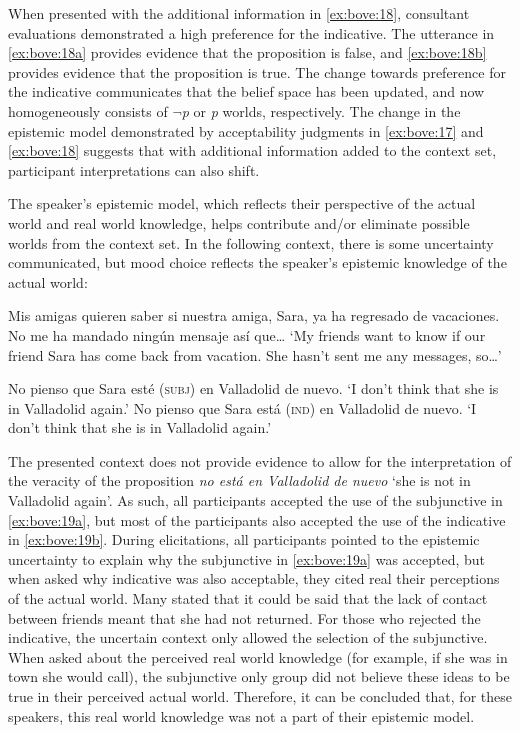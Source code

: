 \documentclass[output=paper,colorlinks,citecolor=brown,
]{langscibook}
\begin{document}
When presented with the additional information in \ref{ex:bove:18}, consultant evaluations demonstrated a high preference for the indicative. The utterance in \ref{ex:bove:18a} provides evidence that the proposition is false, and \ref{ex:bove:18b} provides evidence that the proposition is true. The change towards preference for the indicative communicates that the belief space has been updated, and now homogeneously consists of $\neg$\textit{p} or \textit{p }worlds, respectively. The change in the epistemic model demonstrated by acceptability judgments in \ref{ex:bove:17} and \ref{ex:bove:18} suggests that with additional information added to the context set, participant interpretations can also shift. 



The speaker's epistemic model, which reflects their perspective of the actual world and real world knowledge, helps contribute and/or eliminate possible worlds from the context set. In the following context, there is some uncertainty communicated, but mood choice reflects the speaker's epistemic knowledge of the actual world:


\begin{exe} %
    \ex\label{ex:bove:19} 
   Mis amigas quieren saber si nuestra amiga, Sara, ya ha regresado de vacaciones. No me ha mandado ningún mensaje así que\dots
    \glt `My friends want to know if our friend Sara has come back from vacation. She hasn’t sent me any messages, so\dots'
    \begin{xlist} %
        \ex \label{ex:bove:19a}
           No pienso que Sara esté (\textsc{subj}) en Valladolid de nuevo.  %
                   \glt `I don’t think that she is in Valladolid again.'
        \ex\label{ex:bove:19b}
            No pienso que Sara está (\textsc{ind}) en Valladolid de nuevo.
                   \glt `I don’t think that she is in Valladolid again.'
\end{xlist}
\end{exe}


The presented context does not provide evidence to allow for the interpretation of the veracity of the proposition \textit{no está en Valladolid de nuevo }`she is not in Valladolid again'. As such, all participants accepted the use of the subjunctive in \ref{ex:bove:19a}, but most of the participants also accepted the use of the indicative in \ref{ex:bove:19b}. During elicitations, all participants pointed to the epistemic uncertainty to explain why the subjunctive in \ref{ex:bove:19a} was accepted, but when asked why indicative was also acceptable, they cited real their perceptions of the actual world. Many stated that it could be said that the lack of contact between friends meant that she had not returned. For those who rejected the indicative, the uncertain context only allowed the selection of the subjunctive. When asked about the perceived real world knowledge (for example, if she was in town she would call), the subjunctive only group did not believe these ideas to be true in their perceived actual world. Therefore, it can be concluded that, for these speakers, this real world knowledge was not a part of their epistemic model. 
\end{document}
